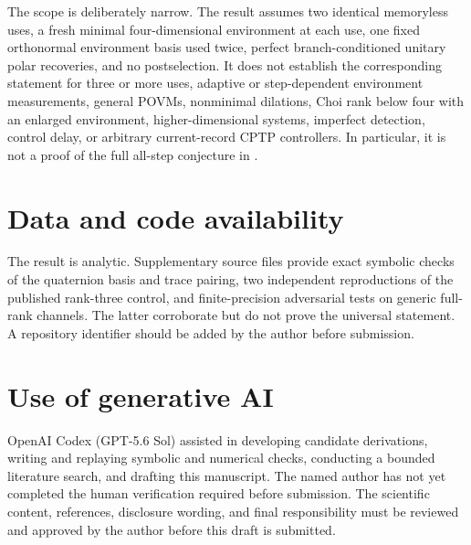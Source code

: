 \documentclass[11pt]{article}
\theoremstyle{remark}
\newcommand{\1}{\mathbb{I}}
\begin{document}
The scope is deliberately narrow.  The result assumes two identical
memoryless uses, a fresh minimal four-dimensional environment at each use,
one fixed orthonormal environment basis used twice, perfect branch-conditioned
unitary polar recoveries, and no postselection.  It does not establish the
corresponding statement for three or more uses, adaptive or step-dependent
environment measurements, general POVMs, nonminimal dilations, Choi rank
below four with an enlarged environment, higher-dimensional systems,
imperfect detection, control delay, or arbitrary current-record CPTP
controllers.  In particular, it is not a proof of the full all-step
conjecture in \cite{RexitiEtAl2024}.

\section*{Data and code availability}

The result is analytic.  Supplementary source files provide exact symbolic
checks of the quaternion basis and trace pairing, two independent
reproductions of the published rank-three control, and finite-precision
adversarial tests on generic full-rank channels.  The latter corroborate but
do not prove the universal statement.  A repository identifier should be
added by the author before submission.

\section*{Use of generative AI}

OpenAI Codex (GPT-5.6 Sol) assisted in developing candidate derivations, writing
and replaying symbolic and numerical checks, conducting a bounded literature
search, and drafting this manuscript.  The named author has not yet completed
the human verification required before submission.  The scientific content,
references, disclosure wording, and final responsibility must be reviewed and
approved by the author before this draft is submitted.

\begingroup
\footnotesize


\endgroup
\end{document}
